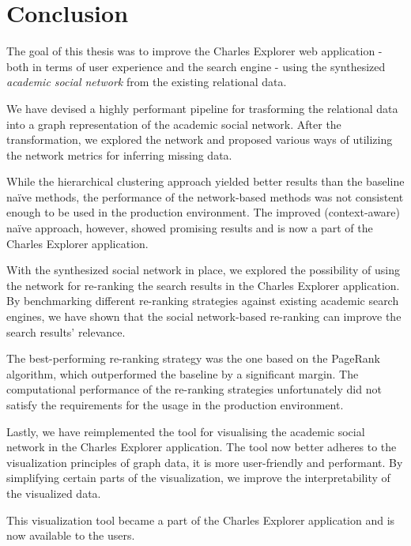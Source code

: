 \chapter*{Conclusion}

The goal of this thesis was to improve the Charles Explorer web application - both in terms of user experience and the search engine - using the synthesized \textit{academic social network} from the existing relational data.

We have devised a highly performant pipeline for trasforming the relational data into a graph representation of the academic social network.
After the transformation, we explored the network and proposed various ways of utilizing the network metrics for inferring missing data.

While the hierarchical clustering approach yielded better results than the baseline naïve methods, the performance of the network-based methods was not consistent enough to be used in the production environment.
The improved (context-aware) naïve approach, however, showed promising results and is now a part of the Charles Explorer application.

With the synthesized social network in place, we explored the possibility of using the network for re-ranking the search results in the Charles Explorer application.
By benchmarking different re-ranking strategies against existing academic search engines, we have shown that the social network-based re-ranking can improve the search results' relevance.

The best-performing re-ranking strategy was the one based on the PageRank algorithm, which outperformed the baseline by a significant margin.
The computational performance of the re-ranking strategies unfortunately did not satisfy the requirements for the usage in the production environment.

Lastly, we have reimplemented the tool for visualising the academic social network in the Charles Explorer application. 
The tool now better adheres to the visualization principles of graph data, it is more user-friendly and performant.
By simplifying certain parts of the visualization, we improve the interpretability of the visualized data.

This visualization tool became a part of the Charles Explorer application and is now available to the users.
